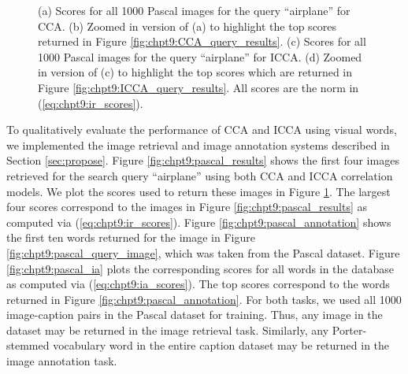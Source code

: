 \begin{figure}[t]
{    \label{fig:chpt9:icca_ir_zoom}}
  \caption{(a) Scores for all 1000 Pascal images for the query ``airplane'' for CCA. (b)
    Zoomed in version of (a) to highlight the top scores returned in Figure
    \ref{fig:chpt9:CCA_query_results}. (c) Scores for all 1000 Pascal
    images for the query ``airplane'' for ICCA. (d) Zoomed in version of (c) to highlight
    the top scores which are returned in Figure \ref{fig:chpt9:ICCA_query_results}. All
    scores are the norm in (\ref{eq:chpt9:ir_scores}).}
  \label{fig:chpt9:pascal_ir}
\end{figure}

To qualitatively evaluate the performance of CCA and ICCA using visual words, we
implemented the image retrieval and image annotation systems described in Section
\ref{sec:propose}. Figure \ref{fig:chpt9:pascal_results} shows the first four images
retrieved for the search query ``airplane'' using both CCA and ICCA correlation models. We
plot the scores used to return these images in Figure \ref{fig:chpt9:pascal_ir}. The
largest four scores correspond to the images in Figure \ref{fig:chpt9:pascal_results} as
computed via (\ref{eq:chpt9:ir_scores}). Figure \ref{fig:chpt9:pascal_annotation} shows
the first ten words returned for the image in Figure \ref{fig:chpt9:pascal_query_image},
which was taken from the Pascal dataset. Figure \ref{fig:chpt9:pascal_ia} plots the
corresponding scores for all words in the database as computed via
(\ref{eq:chpt9:ia_scores}). The top scores correspond to the words returned in Figure
\ref{fig:chpt9:pascal_annotation}. For both tasks, we used all 1000 image-caption pairs in
the Pascal dataset for training. Thus, any image in the dataset may be returned in the
image retrieval task. Similarly, any Porter-stemmed vocabulary word in the entire caption
dataset may be returned in the image annotation task.


